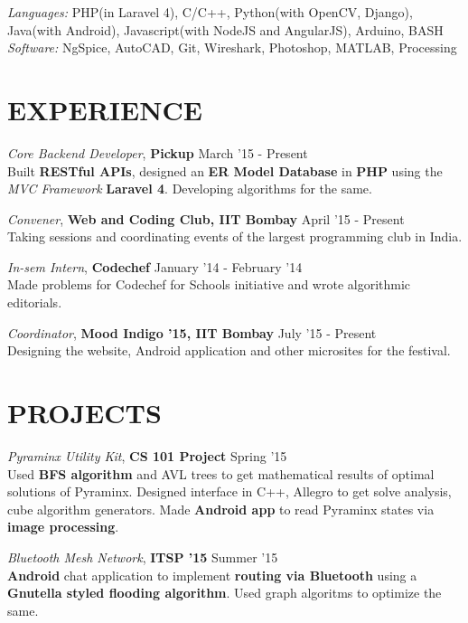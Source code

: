 \documentclass[margin, 10pt]{res} %
\begin{document}
\begin{resume}
{\sl Languages:} PHP(in Laravel 4), C/C++, Python(with OpenCV, Django), Java(with Android), Javascript(with NodeJS and AngularJS), Arduino, BASH\\
{\sl Software:} NgSpice, AutoCAD, Git, Wireshark, Photoshop, MATLAB, Processing
 
 
 
\section{EXPERIENCE}

{\sl Core Backend Developer}, \textbf{Pickup} \hfill March '15 - Present\\
Built \textbf {RESTful APIs}, designed an \textbf {ER Model Database} in \textbf {PHP} using the \textit {MVC Framework} \textbf{Laravel 4}. Developing algorithms for the same.

 
{\sl Convener}, \textbf{Web and Coding Club, IIT Bombay} \hfill April '15 - Present \\
Taking sessions and coordinating events of the largest programming club in India.

{\sl In-sem Intern}, \textbf{Codechef} \hfill January '14 - February '14 \\
Made problems for Codechef for Schools initiative and wrote algorithmic editorials.

{\sl Coordinator}, \textbf{Mood Indigo '15, IIT Bombay} \hfill July '15 - Present \\
Designing the website, Android application and other microsites for the festival.


\section{PROJECTS}

{\sl Pyraminx Utility Kit}, \textbf{CS 101 Project} \hfill Spring '15 \\
Used \textbf{BFS algorithm} and AVL trees to get mathematical results of optimal solutions of Pyraminx. Designed interface in C++, Allegro to get solve analysis, cube algorithm generators. Made \textbf{Android app} to read Pyraminx states via \textbf{image processing}.

{\sl Bluetooth Mesh Network}, \textbf{ITSP '15} \hfill Summer '15 \\
\textbf{Android} chat application to implement \textbf{routing via Bluetooth} using a \textbf{Gnutella styled flooding algorithm}. Used graph algoritms to optimize the same.


\end{resume}
\end{document}
